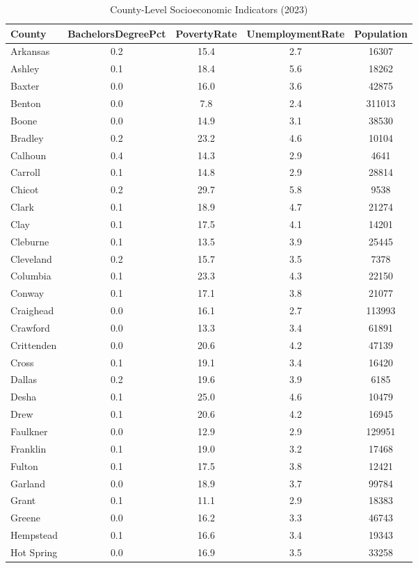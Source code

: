 \begin{table}
\caption{County-Level Socioeconomic Indicators (2023)}
\label{tab:county_indicators}
\begin{tabular}{lcccc}
\toprule
County & BachelorsDegreePct & PovertyRate & UnemploymentRate & Population \\
\midrule
Arkansas & 0.2 & 15.4 & 2.7 & 16307 \\
Ashley & 0.1 & 18.4 & 5.6 & 18262 \\
Baxter & 0.0 & 16.0 & 3.6 & 42875 \\
Benton & 0.0 & 7.8 & 2.4 & 311013 \\
Boone & 0.0 & 14.9 & 3.1 & 38530 \\
Bradley & 0.2 & 23.2 & 4.6 & 10104 \\
Calhoun & 0.4 & 14.3 & 2.9 & 4641 \\
Carroll & 0.1 & 14.8 & 2.9 & 28814 \\
Chicot & 0.2 & 29.7 & 5.8 & 9538 \\
Clark & 0.1 & 18.9 & 4.7 & 21274 \\
Clay & 0.1 & 17.5 & 4.1 & 14201 \\
Cleburne & 0.1 & 13.5 & 3.9 & 25445 \\
Cleveland & 0.2 & 15.7 & 3.5 & 7378 \\
Columbia & 0.1 & 23.3 & 4.3 & 22150 \\
Conway & 0.1 & 17.1 & 3.8 & 21077 \\
Craighead & 0.0 & 16.1 & 2.7 & 113993 \\
Crawford & 0.0 & 13.3 & 3.4 & 61891 \\
Crittenden & 0.0 & 20.6 & 4.2 & 47139 \\
Cross & 0.1 & 19.1 & 3.4 & 16420 \\
Dallas & 0.2 & 19.6 & 3.9 & 6185 \\
Desha & 0.1 & 25.0 & 4.6 & 10479 \\
Drew & 0.1 & 20.6 & 4.2 & 16945 \\
Faulkner & 0.0 & 12.9 & 2.9 & 129951 \\
Franklin & 0.1 & 19.0 & 3.2 & 17468 \\
Fulton & 0.1 & 17.5 & 3.8 & 12421 \\
Garland & 0.0 & 18.9 & 3.7 & 99784 \\
Grant & 0.1 & 11.1 & 2.9 & 18383 \\
Greene & 0.0 & 16.2 & 3.3 & 46743 \\
Hempstead & 0.1 & 16.6 & 3.4 & 19343 \\
Hot Spring & 0.0 & 16.9 & 3.5 & 33258 \\

\end{tabular}
\end{table}
